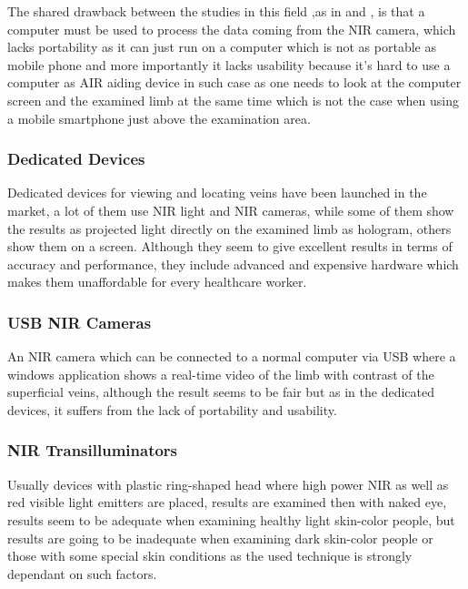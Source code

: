 The shared drawback between the studies in this field ,as in \parencite{study1} and \parencite{study2}, is that a computer must be used to process the data coming
from the NIR camera, which lacks portability as it can just run on a computer which is not as portable as
mobile phone and more importantly it lacks usability because it’s hard to use a
computer as AIR aiding device in such case as one needs to look at the computer screen
and the examined limb at the same time which is not the case when using a mobile
smartphone just above the examination area.

\subsubsection{Dedicated Devices}
Dedicated devices for viewing and locating veins have been launched in the market, a lot of them use NIR light and NIR cameras, while some of them
show the results as projected light directly on the examined limb as hologram, others show
them on a screen. Although they seem to give excellent results in terms of accuracy and
performance, they include advanced and expensive hardware which makes them
unaffordable for every healthcare worker. 
\subsubsection{USB NIR Cameras}
An NIR camera which can be connected to a normal computer via USB where a windows
application shows a real-time video of the limb with contrast of the superficial veins, although
the result seems to be fair but as in the dedicated devices, it suffers from the lack of portability and usability.

\subsubsection{NIR Transilluminators}

Usually devices with plastic ring-shaped head where high power NIR as well as red visible light
emitters are placed, results are examined then with naked eye, results seem to be adequate
when examining healthy light skin-color people, but results are going to be
inadequate when examining dark skin-color people or those with some special skin conditions
as the used technique is strongly dependant on such factors.



 